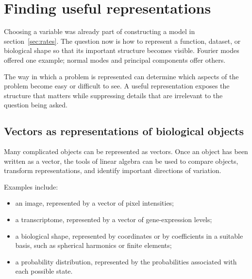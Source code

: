 \clearpage
\section{Finding useful representations}
\label{sec:representations}
Choosing a variable was already part of constructing a model in section~\ref{sec:rates}.
The question now is how to represent a function, dataset, or biological shape so that its important structure becomes visible.
Fourier modes offered one example; normal modes and principal components offer others.



The way in which a problem is represented can determine which aspects of the problem become easy or difficult to see.
A useful representation exposes the structure that matters while suppressing details that are irrelevant to the question being asked.




\subsection{Vectors as representations of biological objects}
\label{sec:vectors}


Many complicated objects can be represented as vectors.
Once an object has been written as a vector, the tools of linear algebra can be used to compare objects, transform representations, and identify important directions of variation.

Examples include:

\begin{itemize}
    \item an image, represented by a vector of pixel intensities;
    \item a transcriptome, represented by a vector of gene-expression levels;
    \item a biological shape, represented by coordinates or by coefficients in a suitable basis, such as spherical harmonics or finite elements;
    \item a probability distribution, represented by the probabilities associated with each possible state.
\end{itemize}


